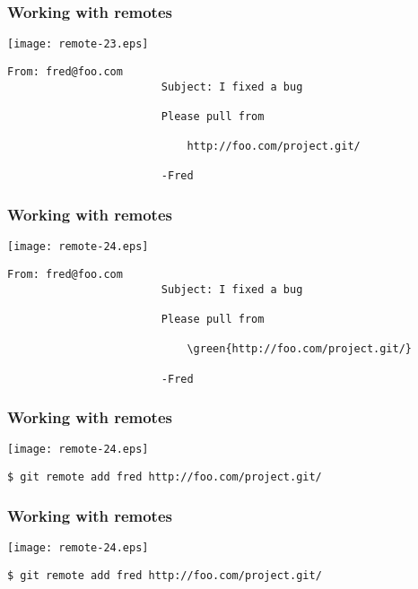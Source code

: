 \documentclass[english]{beamer}
\newcommand{\CMD}[1]{%
\texttt{\textcolor{code-green}{#1}}%
}
\newcommand{\green}[1]{%
\textcolor{code-green}{#1}%
}
\newcommand{\red}[1]{%
\textcolor{code-red}{#1}%
}
\begin{document}
\begin{frame}[fragile]
\frametitle{Working with remotes}

\texttt{[image: remote-23.eps]}

{\tiny
\begin{Verbatim}[commandchars=\\\{\}]
                        From: fred@foo.com
                        Subject: I fixed a bug

                        Please pull from

                            http://foo.com/project.git/

                        -Fred
\end{Verbatim}
}
\vspace{\textheight}
\end{frame}

\begin{frame}[fragile]
\frametitle{Working with remotes}

\texttt{[image: remote-24.eps]}

{\tiny
\begin{Verbatim}[commandchars=\\\{\}]
                        From: fred@foo.com
                        Subject: I fixed a bug

                        Please pull from

                            \green{http://foo.com/project.git/}

                        -Fred
\end{Verbatim}
}
\vspace{\textheight}
\end{frame}

\begin{frame}[fragile]
\frametitle{Working with remotes}

\texttt{[image: remote-24.eps]}

\CMD{\$ git remote add fred http://foo.com/project.git/}
\vspace{\textheight}
\end{frame}

\begin{frame}[fragile]
\frametitle{Working with remotes}

\texttt{[image: remote-24.eps]}

\CMD{\$ git remote add \red{fred} http://foo.com/project.git/}
\vspace{\textheight}
\end{frame}
\end{document}
